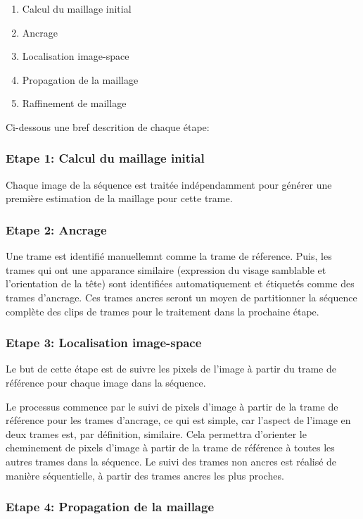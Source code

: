 \documentclass[a4paper,12pt]{article}
\begin{document}
\begin{enumerate}
\item Calcul du maillage initial
\item Ancrage
\item Localisation image-space
\item Propagation de la maillage
\item Raffinement de maillage
\end{enumerate}

Ci-dessous une bref descrition de chaque étape:

\subsubsection*{Etape 1: Calcul du maillage initial}
Chaque image de la séquence est traitée indépendamment pour générer
une première estimation de la maillage pour cette trame. 

\subsubsection*{Etape 2: Ancrage}
Une trame est identifié manuellemnt comme la trame de réference. Puis,
les trames qui ont une apparance similaire (expression du visage
samblable et l'orientation de la tête) sont identifiées
automatiquement et étiquetés comme des trames d'ancrage. Ces trames
ancres seront un moyen de partitionner la séquence complète des clips
de trames pour le traitement dans la prochaine étape. 

\subsubsection*{Etape 3: Localisation image-space}
Le but de cette étape est de suivre les pixels de l'image à partir du
trame de référence pour chaque image dans la séquence.  

Le processus commence par le suivi de pixels d'image à partir de la
trame de référence pour les trames d'ancrage, ce qui est simple, car
l'aspect de l'image en deux trames est, par définition,
similaire. Cela permettra d'orienter le cheminement de pixels d'image
à partir de la trame de référence à toutes les autres trames dans la
séquence.  
Le suivi des trames non ancres est réalisé de manière séquentielle, à
partir des trames ancres les plus proches.

\subsubsection*{Etape 4: Propagation de la maillage}
\end{document}
